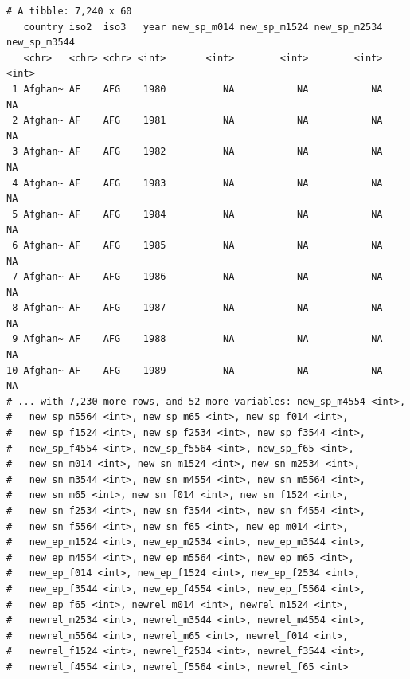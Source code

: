 \documentclass[
  11pt,
]{krantz}
\begin{document}
\begin{verbatim}
# A tibble: 7,240 x 60
   country iso2  iso3   year new_sp_m014 new_sp_m1524 new_sp_m2534 new_sp_m3544
   <chr>   <chr> <chr> <int>       <int>        <int>        <int>        <int>
 1 Afghan~ AF    AFG    1980          NA           NA           NA           NA
 2 Afghan~ AF    AFG    1981          NA           NA           NA           NA
 3 Afghan~ AF    AFG    1982          NA           NA           NA           NA
 4 Afghan~ AF    AFG    1983          NA           NA           NA           NA
 5 Afghan~ AF    AFG    1984          NA           NA           NA           NA
 6 Afghan~ AF    AFG    1985          NA           NA           NA           NA
 7 Afghan~ AF    AFG    1986          NA           NA           NA           NA
 8 Afghan~ AF    AFG    1987          NA           NA           NA           NA
 9 Afghan~ AF    AFG    1988          NA           NA           NA           NA
10 Afghan~ AF    AFG    1989          NA           NA           NA           NA
# ... with 7,230 more rows, and 52 more variables: new_sp_m4554 <int>,
#   new_sp_m5564 <int>, new_sp_m65 <int>, new_sp_f014 <int>,
#   new_sp_f1524 <int>, new_sp_f2534 <int>, new_sp_f3544 <int>,
#   new_sp_f4554 <int>, new_sp_f5564 <int>, new_sp_f65 <int>,
#   new_sn_m014 <int>, new_sn_m1524 <int>, new_sn_m2534 <int>,
#   new_sn_m3544 <int>, new_sn_m4554 <int>, new_sn_m5564 <int>,
#   new_sn_m65 <int>, new_sn_f014 <int>, new_sn_f1524 <int>,
#   new_sn_f2534 <int>, new_sn_f3544 <int>, new_sn_f4554 <int>,
#   new_sn_f5564 <int>, new_sn_f65 <int>, new_ep_m014 <int>,
#   new_ep_m1524 <int>, new_ep_m2534 <int>, new_ep_m3544 <int>,
#   new_ep_m4554 <int>, new_ep_m5564 <int>, new_ep_m65 <int>,
#   new_ep_f014 <int>, new_ep_f1524 <int>, new_ep_f2534 <int>,
#   new_ep_f3544 <int>, new_ep_f4554 <int>, new_ep_f5564 <int>,
#   new_ep_f65 <int>, newrel_m014 <int>, newrel_m1524 <int>,
#   newrel_m2534 <int>, newrel_m3544 <int>, newrel_m4554 <int>,
#   newrel_m5564 <int>, newrel_m65 <int>, newrel_f014 <int>,
#   newrel_f1524 <int>, newrel_f2534 <int>, newrel_f3544 <int>,
#   newrel_f4554 <int>, newrel_f5564 <int>, newrel_f65 <int>
\end{verbatim}
\end{document}
